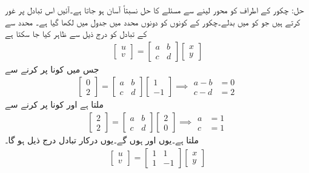 حل: چکور  کے اطراف کو  محور  لینے سے مسئلے کا حل نسبتاً آسان ہو جاتا ہے۔آئیں اس تبادل پر غور کرتے ہیں جو  کو  میں بدلے۔چکور کے کونوں کو دونوں محدد میں جدول  میں لکھا گیا ہے۔  محدد سے  کے تبادل کو درج ذیل سے ظاہر کیا جا سکتا ہے
\begin{align*}
\begin{bmatrix}
u\\v
\end{bmatrix}=
\begin{bmatrix}
a&b\\
c&d
\end{bmatrix}
\begin{bmatrix}
x\\
y
\end{bmatrix}
\end{align*}
جس میں کونا  پر کرنے سے
\begin{gather*}
\begin{bmatrix}
0\\2
\end{bmatrix}=
\begin{bmatrix}
a&b\\
c&d
\end{bmatrix}
\begin{bmatrix}
1\\
-1
\end{bmatrix}
\implies
\begin{aligned}
a-b&=0\\
c-d&=2
\end{aligned}
\end{gather*}
ملتا ہے اور کونا  پر کرنے سے
\begin{gather*}
\begin{bmatrix}
2\\2
\end{bmatrix}=
\begin{bmatrix}
a&b\\
c&d
\end{bmatrix}
\begin{bmatrix}
2\\
0
\end{bmatrix}
\implies
\begin{aligned}
a&=1\\
c&=1
\end{aligned}
\end{gather*}
ملتا ہے۔یوں  اور  ہوں گے۔یوں درکار تبادل درج ذیل ہو گا۔
\begin{align*}
\begin{bmatrix}
u\\v
\end{bmatrix}=
\begin{bmatrix}
1&1\\
1&-1
\end{bmatrix}
\begin{bmatrix}
x\\
y
\end{bmatrix}
\end{align*}

